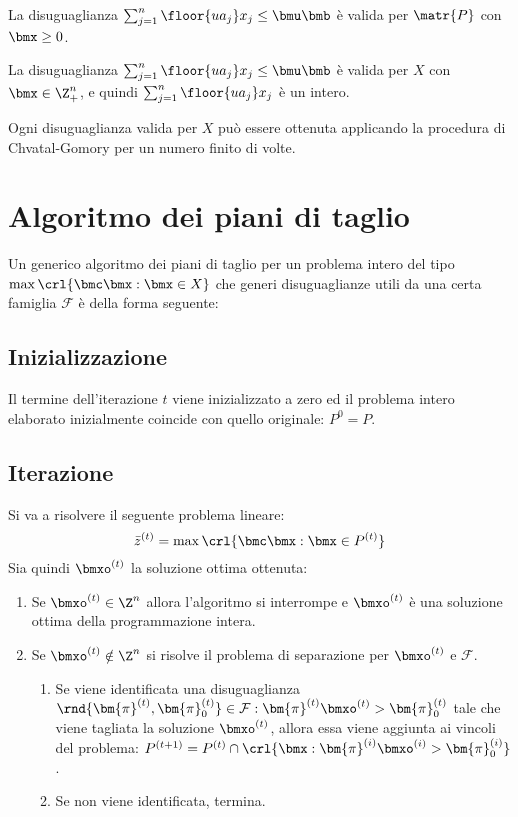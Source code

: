 \documentclass[\main/main.tex]{subfiles}
\begin{document}
La disuguaglianza \(\sum_{j=1}^n \floor{ua_j} x_j \leq \bmu\bmb \) è valida per \(\matr{P}\) con \(\bmx \geq 0\).

La disuguaglianza \(\sum_{j=1}^n \floor{ua_j} x_j \leq \bmu\bmb \) è valida per \(X\) con \(\bmx \in \Z^n_+\), e quindi \(\sum_{j=1}^n \floor{ua_j} x_j\) è un intero.

\begin{theorem}
    Ogni disuguaglianza valida per \(X\) può essere ottenuta applicando la procedura di Chvatal-Gomory per un numero finito di volte.
\end{theorem}
\clearpage
\section{Algoritmo dei piani di taglio}
Un generico algoritmo dei piani di taglio per un problema intero del tipo \(\max\crl{\bmc\bmx: \bmx \in X}\) che generi disuguaglianze utili da una certa famiglia \(\mathcal{F}\) è della forma seguente:

\subsection{Inizializzazione}
Il termine dell'iterazione \(t\) viene inizializzato a zero ed il problema intero elaborato inizialmente coincide con quello originale: \(P^0 = P\).

\subsection{Iterazione}
Si va a risolvere il seguente problema lineare:
\[
    \bar{z}^{(t)} = \max\crl{\bmc\bmx: \bmx \in P^{(t)}}
\]
Sia quindi \(\bmxo^{(t)}\) la soluzione ottima ottenuta:

\begin{enumerate}
    \item Se \(\bmxo^{(t)} \in \Z^n\) allora l'algoritmo si interrompe e \(\bmxo^{(t)}\) è una soluzione ottima della programmazione intera.
    \item Se \(\bmxo^{(t)} \notin \Z^n\) si risolve il problema di separazione per \(\bmxo^{(t)}\) e \(\mathcal{F}\).
    \begin{enumerate}
        \item Se viene identificata una disuguaglianza \(\rnd{\bm{\pi}^{(t)}, \bm{\pi}^{(t)}_0} \in \mathcal{F}: \bm{\pi}^{(t)}\bmxo^{(t)} > \bm{\pi}^{(t)}_0\) tale che viene tagliata la soluzione \(\bmxo^{(t)}\), allora essa viene aggiunta ai vincoli del problema: \(P^{(t+1)} = P^{(t)} \cap \crl{\bmx: \bm{\pi}^{(i)}\bmxo^{(i)} > \bm{\pi}^{(i)}_0} \).
        \item Se non viene identificata, termina.
    \end{enumerate}
\end{enumerate}
\end{document}
